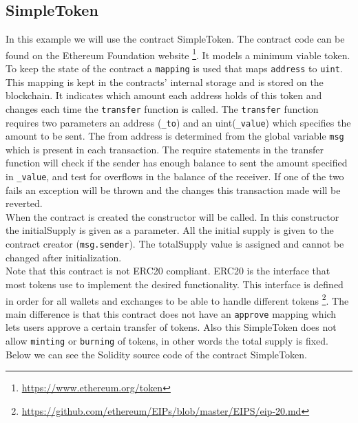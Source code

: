 \documentclass[a4paper]{article}
\begin{document}
\subsection{SimpleToken}
In this example we will use the contract SimpleToken. The contract code can be found on the Ethereum Foundation website \footnote{\url{https://www.ethereum.org/token}}. 
It models a minimum viable token. To keep the state of the contract a \texttt{mapping} is used that maps \texttt{address} to \texttt{uint}. This mapping is kept in the contracts' internal storage and is stored on the blockchain. It indicates which amount each address holds of this token and changes each time the \texttt{transfer} function is called. The \texttt{transfer} function requires two parameters an address (\texttt{\_to})  and an uint(\texttt{\_value}) which specifies the amount to be sent. The from address is determined from the global variable \texttt{msg} which is present in each transaction. The require statements in the transfer function will check if the sender has enough balance to sent the amount specified in \texttt{\_value}, and test for overflows in the balance of the receiver. If one of the two fails an exception will be thrown and the changes this transaction made will be reverted.\\
When the contract is created the constructor will be called. In this constructor the initialSupply is given as a parameter. All the initial supply is given to the contract creator (\texttt{msg.sender}). The totalSupply value is assigned and cannot be changed after initialization.\\
Note that this contract is not ERC20 compliant. ERC20 is the interface that most tokens use to implement the desired functionality. This interface is defined in order for all wallets and exchanges to be able to handle different tokens \footnote{\url{https://github.com/ethereum/EIPs/blob/master/EIPS/eip-20.md}}. The main difference is that this contract does not have an \texttt{approve} mapping which lets users approve a certain transfer of tokens. Also this SimpleToken does not allow \texttt{minting} or \texttt{burning} of tokens, in other words the total supply is fixed. Below we can see the Solidity source code of the contract SimpleToken.


\end{document}
